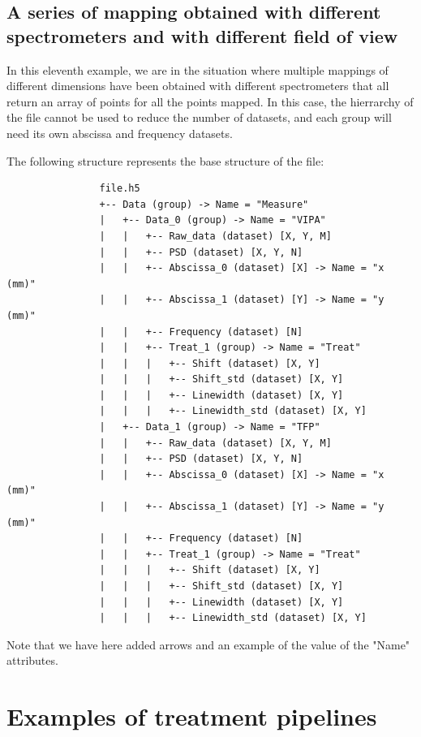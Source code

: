 \documentclass{book}
\begin{document}
    \section{A series of mapping obtained with different spectrometers and with different field of view}
        In this eleventh example, we are in the situation where multiple mappings of different dimensions have been obtained with different spectrometers that all return an array of points for all the points mapped. In this case, the hierrarchy of the file cannot be used to reduce the number of datasets, and each group will need its own abscissa and frequency datasets.

            The following structure represents the base structure of the file:
            \begin{verbatim}
                file.h5
                +-- Data (group) -> Name = "Measure"
                |   +-- Data_0 (group) -> Name = "VIPA"
                |   |   +-- Raw_data (dataset) [X, Y, M]
                |   |   +-- PSD (dataset) [X, Y, N]
                |   |   +-- Abscissa_0 (dataset) [X] -> Name = "x (mm)"
                |   |   +-- Abscissa_1 (dataset) [Y] -> Name = "y (mm)"
                |   |   +-- Frequency (dataset) [N]
                |   |   +-- Treat_1 (group) -> Name = "Treat"
                |   |   |   +-- Shift (dataset) [X, Y]
                |   |   |   +-- Shift_std (dataset) [X, Y]
                |   |   |   +-- Linewidth (dataset) [X, Y]
                |   |   |   +-- Linewidth_std (dataset) [X, Y]
                |   +-- Data_1 (group) -> Name = "TFP"
                |   |   +-- Raw_data (dataset) [X, Y, M]
                |   |   +-- PSD (dataset) [X, Y, N]
                |   |   +-- Abscissa_0 (dataset) [X] -> Name = "x (mm)"
                |   |   +-- Abscissa_1 (dataset) [Y] -> Name = "y (mm)"
                |   |   +-- Frequency (dataset) [N]
                |   |   +-- Treat_1 (group) -> Name = "Treat"
                |   |   |   +-- Shift (dataset) [X, Y]
                |   |   |   +-- Shift_std (dataset) [X, Y]
                |   |   |   +-- Linewidth (dataset) [X, Y]
                |   |   |   +-- Linewidth_std (dataset) [X, Y]
            \end{verbatim}
            Note that we have here added arrows and an example of the value of the "Name" attributes.

\chapter{Examples of treatment pipelines}
\end{document}
